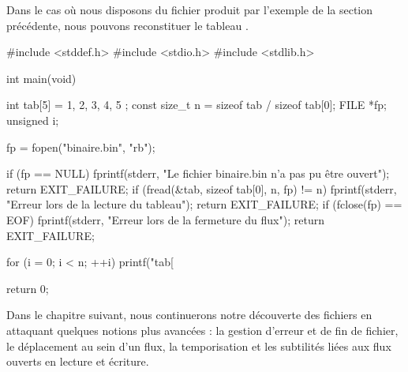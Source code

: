 Dans le cas où nous disposons du fichier  produit
par l'exemple de la section précédente, nous pouvons reconstituer le
tableau .

\begin{C}
#include <stddef.h>
#include <stdio.h>
#include <stdlib.h>


int main(void)
{
    int tab[5] = { 1, 2, 3, 4, 5 };
    const size_t n = sizeof tab / sizeof tab[0];
    FILE *fp;
    unsigned i;

    fp = fopen("binaire.bin", "rb");

    if (fp == NULL)
    {
        fprintf(stderr, "Le fichier binaire.bin n'a pas pu être ouvert\n");
        return EXIT_FAILURE;
    }
    if (fread(&tab, sizeof tab[0], n, fp) != n)
    {
            fprintf(stderr, "Erreur lors de la lecture du tableau\n");
            return EXIT_FAILURE;
    }
    if (fclose(fp) == EOF)
    {
        fprintf(stderr, "Erreur lors de la fermeture du flux\n");
        return EXIT_FAILURE;        
    }

    for (i = 0; i < n; ++i)
        printf("tab[%

    return 0;
}
\end{C}

\hrulefill

Dans le chapitre suivant, nous continuerons notre découverte des
fichiers en attaquant quelques notions plus avancées : la gestion
d'erreur et de fin de fichier, le déplacement au sein d'un flux, la
temporisation et les subtilités liées aux flux ouverts en lecture et
écriture.
